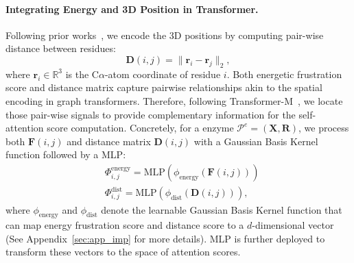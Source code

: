 \paragraph{Integrating Energy and 3D Position in Transformer.}
Following prior works~\cite{TransformerM}, we encode the 3D positions by computing pair-wise distance between residues:
\begin{equation}
    \mathbf{D}(i,j) = \|\mathbf{r}_i-\mathbf{r}_j\|_2,
    \label{eq:distance calculation}
\end{equation}
where $\mathbf{r}_i \in \mathbb{R}^3$ is the C\(\alpha\)-atom coordinate of residue \(i\).
Both energetic frustration score and distance matrix capture pairwise relationships akin to the spatial encoding in graph transformers. Therefore, following Transformer-M~\cite{TransformerM}, we locate those pair-wise signals to provide complementary information for the self-attention score computation.
Concretely, for a enzyme $\mathcal{P}^e = (\mathbf{X}, \mathbf{R})$, we process both  $\mathbf{F}(i,j)$ and distance matrix $\mathbf{D}(i,j)$ with a Gaussian Basis Kernel function followed by a MLP:
\begin{equation}
\begin{aligned}
        & \Phi_{i,j}^{\mathrm{energy}}  = \mathrm{MLP}(\phi_{\mathrm{energy}}(\mathbf{F}(i,j))) \\
        & \Phi_{i,j}^{\mathrm{dist}} = \mathrm{MLP}(\phi_{\mathrm{dist}}(\mathbf{D}(i,j))),
        \label{eq:Gauss}
\end{aligned}
\end{equation}
where $\phi_{\mathrm{energy}}$ and $ \phi_{\mathrm{dist}}$ denote the learnable Gaussian Basis Kernel function that can map energy frustration score and distance score to a $d$-dimensional vector (See Appendix~\ref{sec:app_imp} for more details). MLP is further deployed to transform these vectors to the space of attention scores. 


